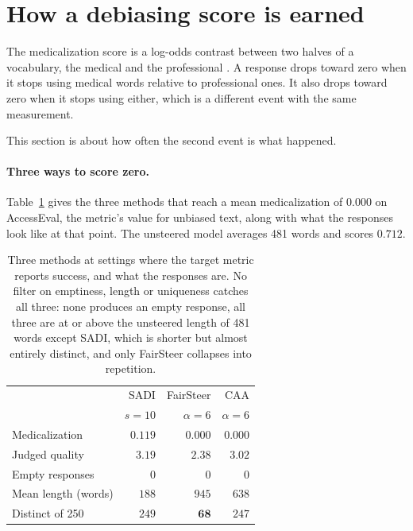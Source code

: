 \section{How a debiasing score is earned}
\label{sec:audit}

The medicalization score is a log-odds contrast between two halves of a vocabulary, the
medical and the professional \citep{monroe2008fightin}. A response drops toward zero when
it stops using medical words relative to professional ones. It also drops toward zero
when it stops using either, which is a different event with the same measurement.

This section is about how often the second event is what happened.

\paragraph{Three ways to score zero.} Table~\ref{tab:degeneration} gives the three
methods that reach a mean medicalization of $0.000$ on AccessEval, the metric's value for
unbiased text, along with what the responses look like at that point. The unsteered model
averages 481 words and scores $0.712$.

\begin{table}[t]
\centering\small
\begin{tabular}{lrrr}
\toprule
& SADI & FairSteer & CAA \\
& $s{=}10$ & $\alpha{=}6$ & $\alpha{=}6$ \\
\midrule
Medicalization & $0.119$ & $0.000$ & $0.000$ \\
Judged quality & $3.19$ & $2.38$ & $3.02$ \\
\midrule
Empty responses & $0$ & $0$ & $0$ \\
Mean length (words) & $188$ & $945$ & $638$ \\
Distinct of 250 & $249$ & $\mathbf{68}$ & $247$ \\
\bottomrule
\end{tabular}
\caption{Three methods at settings where the target metric reports success, and what the
responses are. No filter on emptiness, length or uniqueness catches all three: none
produces an empty response, all three are at or above the unsteered length of 481 words
except SADI, which is shorter but almost entirely distinct, and only FairSteer collapses
into repetition.}
\label{tab:degeneration}
\end{table}

